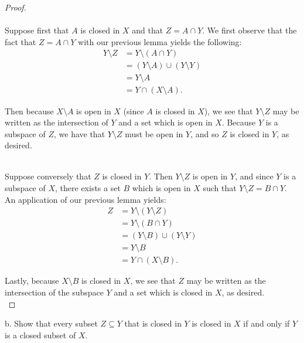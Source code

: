 \begin{proof}\ \\\\
    Suppose first that $A$ is closed in $X$ and that $Z = A \cap Y$. We first observe that the fact that $Z = A \cap Y$
    with our previous lemma yields the following:
    \begin{align*}
        Y \setminus Z &= Y \setminus (A \cap Y) \\
                      &= (Y \setminus A) \cup (Y \setminus Y) \\
                      &= Y \setminus A \\
                      &= Y \cap (X \setminus A).
    \end{align*}

    Then because $X \setminus A$ is open in $X$ (since $A$ is closed in $X$), we see that $Y \setminus Z$ may be 
    written as the intersection of $Y$ and a set which is open in $X$. Because $Y$ is a subspace of $Z$, we have that
    $Y \setminus Z$ must be open in $Y$, and so $Z$ is closed in $Y$, as desired.

    \ \\
    Suppose conversely that $Z$ is closed in $Y$. Then $Y \setminus Z$ is open in $Y$, and since $Y$ is a subspace of 
    $X$, there exists a set $B$ which is open in $X$ such that $Y \setminus Z = B \cap Y$. An application of our 
    previous lemma yields:
    \begin{align*}
        Z &= Y \setminus (Y \setminus Z) \\
          &= Y \setminus (B \cap Y) \\
          &= (Y \setminus B) \cup (Y \setminus Y) \\
          &= Y \setminus B \\
          &= Y \cap (X \setminus B).
    \end{align*}

    Lastly, because $X \setminus B$ is closed in $X$, we see that $Z$ may be written as the 
    intersection of the subspace $Y$ and a set which is closed in $X$, as desired.
    \ \\
\end{proof}

\pagebreak
b.  Show that every subset $Z \subseteq Y$ that is closed in $Y$ is closed in $X$ if and only if $Y$ is a closed subset
    of $X$.

